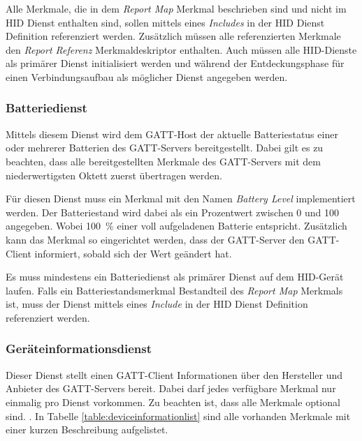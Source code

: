 Alle Merkmale, die in dem \textit{Report Map} Merkmal beschrieben sind und nicht im \acs{HID} Dienst enthalten sind, sollen mittels eines \textit{Includes} in der \acs{HID} Dienst Definition referenziert werden. Zusätzlich müssen alle referenzierten Merkmale den \textit{Report Referenz} Merkmaldeskriptor enthalten. Auch müssen alle \acs{HID}-Dienste als primärer Dienst initialisiert werden und während der Entdeckungsphase für einen Verbindungsaufbau als möglicher Dienst angegeben werden. \cite[S.~13f.]{bluetoothHOGP}

\subsubsection{Batteriedienst}
Mittels diesem Dienst wird dem \acs{GATT}-Host der aktuelle Batteriestatus einer oder mehrerer Batterien des \acs{GATT}-Servers bereitgestellt. Dabei gilt es zu beachten, dass alle bereitgestellten Merkmale des \acs{GATT}-Servers mit dem niederwertigsten Oktett zuerst übertragen werden. \cite[S.~6]{bluetoothBatteryS}

Für diesen Dienst muss ein Merkmal mit den Namen \textit{Battery Level} implementiert werden. Der Batteriestand wird dabei als ein Prozentwert zwischen 0 und 100 angegeben. Wobei 100~\% einer voll aufgeladenen Batterie entspricht. Zusätzlich kann das Merkmal so eingerichtet werden, dass der \acs{GATT}-Server den \acs{GATT}-Client informiert, sobald sich der Wert geändert hat. \cite[S.~8]{bluetoothBatteryS}

Es muss mindestens ein Batteriedienst als primärer Dienst auf dem \acs{HID}-Gerät laufen. Falls ein Batteriestandsmerkmal Bestandteil des \textit{Report Map} Merkmals ist, muss der Dienst mittels eines \textit{Include} in der \acs{HID} Dienst Definition referenziert werden. \cite[S.~14]{bluetoothHOGP}

\subsubsection{Geräteinformationsdienst}
Dieser Dienst stellt einen \acs{GATT}-Client Informationen über den Hersteller und Anbieter des \acs{GATT}-Servers bereit. Dabei darf jedes verfügbare Merkmal nur einmalig pro Dienst vorkommen. Zu beachten ist, dass alle Merkmale optional sind. \cite[S.~6ff.]{bluetoothDeviceI}. In Tabelle \ref{table:deviceinformationlist} sind alle vorhanden Merkmale mit einer kurzen Beschreibung aufgelistet.

